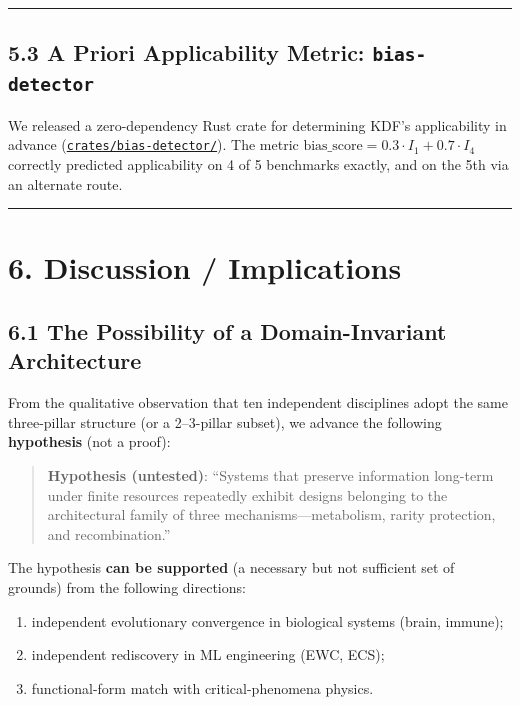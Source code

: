 \begin{center}\rule{0.5\linewidth}{0.5pt}\end{center}

\subsection{\texorpdfstring{5.3 A Priori Applicability Metric: \texttt{bias-detector}}{5.3 A Priori Applicability Metric: bias-detector}}\label{a-priori-applicability-metric-bias-detector}

We released a zero-dependency Rust crate for determining KDF's applicability in advance (\href{../../crates/bias-detector/}{\texttt{crates/bias-detector/}}). The metric \(\text{bias\_score} = 0.3 \cdot I_1 + 0.7 \cdot I_4\) correctly predicted applicability on 4 of 5 benchmarks exactly, and on the 5th via an alternate route.

\begin{center}\rule{0.5\linewidth}{0.5pt}\end{center}

\section{6. Discussion / Implications}\label{discussion-implications}

\subsection{6.1 The Possibility of a Domain-Invariant Architecture}\label{the-possibility-of-a-domain-invariant-architecture}

From the qualitative observation that ten independent disciplines adopt the same three-pillar structure (or a 2--3-pillar subset), we advance the following \textbf{hypothesis} (not a proof):

\begin{quote}
\textbf{Hypothesis (untested)}: ``Systems that preserve information long-term under finite resources repeatedly exhibit designs belonging to the architectural family of three mechanisms---metabolism, rarity protection, and recombination.''
\end{quote}

The hypothesis \textbf{can be supported} (a necessary but not sufficient set of grounds) from the following directions:

\begin{enumerate}
\def\labelenumi{(\alph{enumi})}
\tightlist
\item
  independent evolutionary convergence in biological systems (brain, immune);
\item
  independent rediscovery in ML engineering (EWC, ECS);
\item
  functional-form match with critical-phenomena physics.
\end{enumerate}

